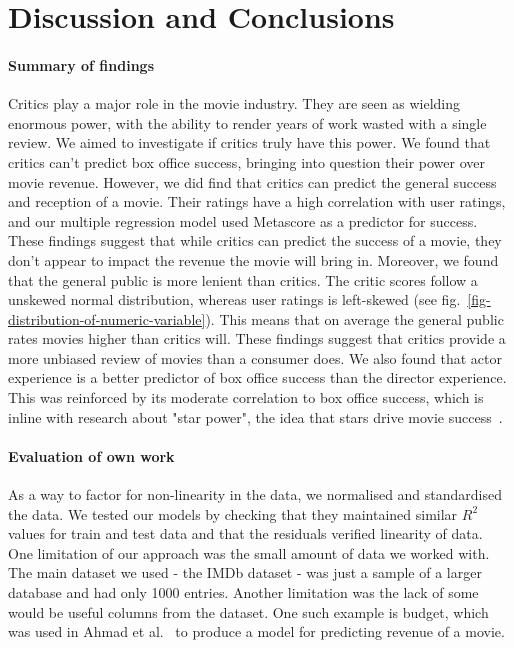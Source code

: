 \section{Discussion and Conclusions}
    \begin{multicols}{2}
        \paragraph{Summary of findings}
            Critics play a major role in the movie industry.
            They are seen as wielding enormous power, with the ability to render years of
                work wasted with a single review.
            We aimed to investigate if critics truly have this power.
            We found that critics can't predict box office success, bringing into question
                their power over movie revenue.
            However, we did find that critics can predict the general success and reception
                of a movie.
            Their ratings have a high correlation with user ratings, and our multiple
                regression model used Metascore as a predictor for success.
            These findings suggest that while critics can predict the success of a movie,
                they don't appear to impact the revenue the movie will bring in.
            Moreover, we found that the general public is more lenient than critics.
            The critic scores follow a unskewed normal distribution, whereas user ratings
                is left-skewed (see fig.~\ref{fig-distribution-of-numeric-variable}).
            This means that on average the general public rates movies higher than critics
                will.
            These findings suggest that critics provide a more unbiased review of movies
                than a consumer does.
            We also found that actor experience is a better predictor of box office success
                than the director experience.
            This was reinforced by its moderate correlation to box office success, which is
                inline with research about "star power", the idea that stars drive movie
                success~\cite{elberse2007power}.

        \paragraph{Evaluation of own work}
            As a way to factor for non-linearity in the data, we normalised and
                standardised the data.
            We tested our models by checking that they maintained similar $R^2$ values for
                train and test data and that the residuals verified linearity of data.
            One limitation of our approach was the small amount of data we worked with.
            The main dataset we used - the IMDb dataset - was just a sample of a larger
                database and had only 1000 entries.
            Another limitation was the lack of some would be useful columns from the
                dataset.
            One such example is budget, which was used in Ahmad et
                al.~\cite{ahmadDuraisamyYousefBuckles} to produce a model for predicting
                revenue of a movie.


\end{multicols}
